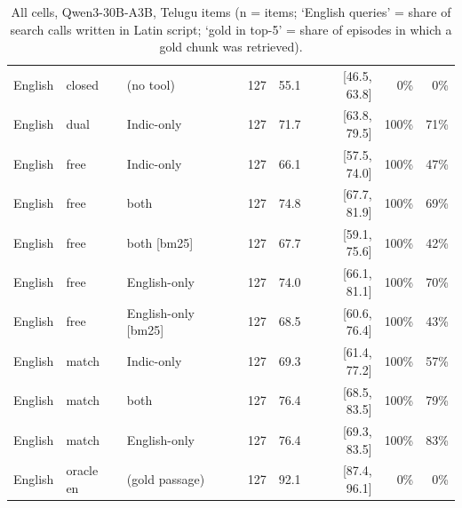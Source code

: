 \begin{table}[h]
\begin{tabular}{lllrrrrr}
English & closed & (no tool) & 127 & 55.1 & [46.5, 63.8] & 0\% & 0\% \\
English & dual & Indic-only & 127 & 71.7 & [63.8, 79.5] & 100\% & 71\% \\
English & free & Indic-only & 127 & 66.1 & [57.5, 74.0] & 100\% & 47\% \\
English & free & both & 127 & 74.8 & [67.7, 81.9] & 100\% & 69\% \\
English & free & both [bm25] & 127 & 67.7 & [59.1, 75.6] & 100\% & 42\% \\
English & free & English-only & 127 & 74.0 & [66.1, 81.1] & 100\% & 70\% \\
English & free & English-only [bm25] & 127 & 68.5 & [60.6, 76.4] & 100\% & 43\% \\
English & match & Indic-only & 127 & 69.3 & [61.4, 77.2] & 100\% & 57\% \\
English & match & both & 127 & 76.4 & [68.5, 83.5] & 100\% & 79\% \\
English & match & English-only & 127 & 76.4 & [69.3, 83.5] & 100\% & 83\% \\
English & oracle en & (gold passage) & 127 & 92.1 & [87.4, 96.1] & 0\% & 0\% \\
\bottomrule
\end{tabular}
\caption{All cells, Qwen3-30B-A3B, Telugu items (n = items; `English queries' = share of search calls written in Latin script; `gold in top-5' = share of episodes in which a gold chunk was retrieved).}
\end{table}
